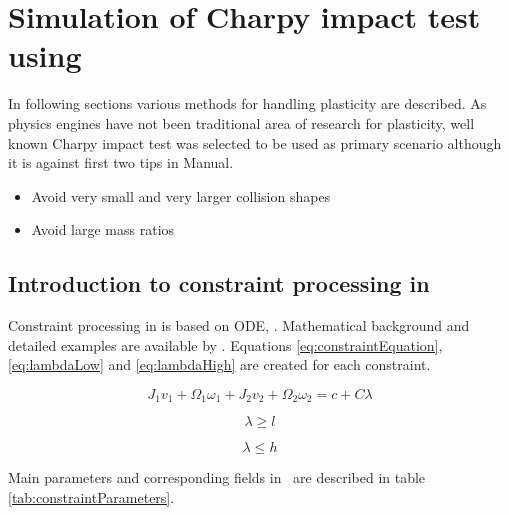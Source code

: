 \section{Simulation of Charpy impact test using \bullet}
\label{sec:bullet-charpy}

In following sections various methods for handling plasticity are described.
As physics engines have not been traditional area of research for plasticity, 
well known Charpy impact test was selected to be used as primary scenario
although it is against first two tips in \bullet Manual.

\begin{itemize}
\item Avoid very small and very larger collision shapes
\item Avoid large mass ratios
\end{itemize}

\subsection{Introduction to constraint processing in \bullet}
Constraint processing in \bullet is based on ODE, \cite{ode}.
Mathematical background and detailed examples are available by \cite{ode.joints}.
Equations \ref{eq:constraintEquation}, \ref{eq:lambdaLow} and
\ref{eq:lambdaHigh} 
are created for each constraint.

\begin{equation} \label{eq:constraintEquation}
J_1 v_1 + \Omega_1 \omega_1 + J_2 v_2 + \Omega_2 \omega_2 = c + C \lambda
\end{equation}

\begin{equation} \label{eq:lambdaLow}
\lambda \geq l
\end{equation}

\begin{equation} \label{eq:lambdaHigh}
\lambda \leq h
\end{equation}

Main parameters  and corresponding fields in \bullet\  
 are described in table \ref{tab:constraintParameters}.

